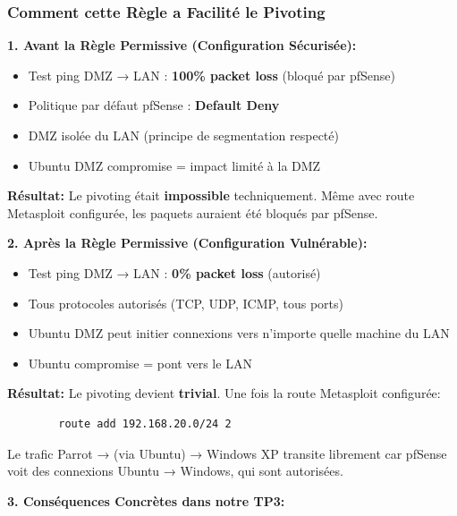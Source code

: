 \documentclass[12pt,a4paper,openany]{report}
\begin{document}
	\subsubsection{Comment cette Règle a Facilité le Pivoting}
	
	\textbf{1. Avant la Règle Permissive (Configuration Sécurisée):}
	
	\begin{itemize}
		\item Test ping DMZ → LAN : \textbf{100\% packet loss} (bloqué par pfSense)
		\item Politique par défaut pfSense : \textbf{Default Deny}
		\item DMZ isolée du LAN (principe de segmentation respecté)
		\item Ubuntu DMZ compromise = impact limité à la DMZ
	\end{itemize}
	
	\textbf{Résultat:} Le pivoting était \textbf{impossible} techniquement. 
	Même avec route Metasploit configurée, les paquets auraient été bloqués 
	par pfSense.
	
	\textbf{2. Après la Règle Permissive (Configuration Vulnérable):}
	
	\begin{itemize}
		\item Test ping DMZ → LAN : \textbf{0\% packet loss} (autorisé)
		\item Tous protocoles autorisés (TCP, UDP, ICMP, tous ports)
		\item Ubuntu DMZ peut initier connexions vers n'importe quelle 
		machine du LAN
		\item Ubuntu compromise = pont vers le LAN
	\end{itemize}
	
	\textbf{Résultat:} Le pivoting devient \textbf{trivial}. Une fois la 
	route Metasploit configurée:
	
	\begin{lstlisting}
		route add 192.168.20.0/24 2
	\end{lstlisting}
	
	Le trafic Parrot → (via Ubuntu) → Windows XP transite librement car 
	pfSense voit des connexions Ubuntu → Windows, qui sont autorisées.
	
	\textbf{3. Conséquences Concrètes dans notre TP3:}
	
\end{document}
